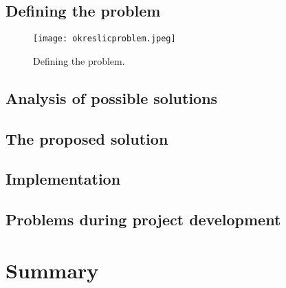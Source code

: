 \documentclass[oneside,a4paper,11pt]{report}
\begin{document}
\section{Defining the problem}

\begin{figure}
	\centering
	\texttt{[image: okreslicproblem.jpeg]}
	\caption{Defining the problem.\label{fig:Defining the problem}}
\end{figure}

\section{Analysis of possible solutions}

\section{The proposed solution}

\section{Implementation}

\section{Problems during project development}

\chapter{Summary}




\clearpage
{}
{}


\end{document}
